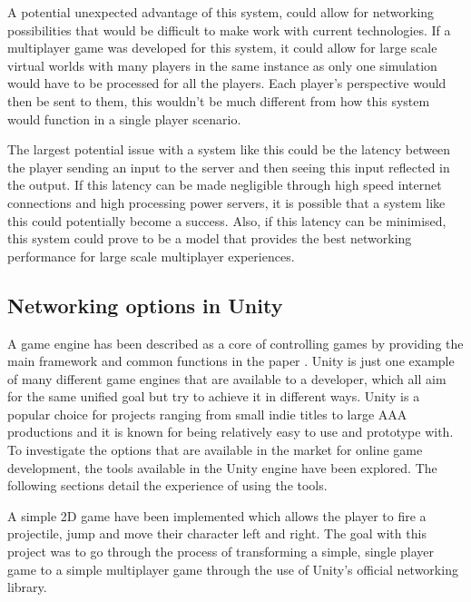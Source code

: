 A potential unexpected advantage of this system, could allow for networking possibilities that would be difficult to make work with current technologies. If a multiplayer game was developed for this system, it could allow for large scale virtual worlds with many players in the same instance as only one simulation would have to be processed for all the players. Each player's perspective would then be sent to them, this wouldn't be much different from how this system would function in a single player scenario.

The largest potential issue with a system like this could be the latency between the player sending an input to the server and then seeing this input reflected in the output. If this latency can be made negligible through high speed internet connections and high processing power servers, it is possible that a system like this could potentially become a success. Also, if this latency can be minimised, this system could prove to be a model that provides the best networking performance for large scale multiplayer experiences.


\subsection{Networking options in Unity}
A game engine has been described as a core of controlling games by providing the main framework and common functions in the paper . Unity is just one example of many different game engines that are available to a developer, which all aim for the same unified goal but try to achieve it in different ways. Unity is a popular choice for projects ranging from small indie titles to large AAA productions and it is known for being relatively easy to use and prototype with. To investigate the options that are available in the market for online game development, the tools available in the Unity engine have been explored. The following sections detail the experience of using the tools.

A simple 2D game have been implemented which allows the player to fire a projectile, jump and move their character left and right. The goal with this project was to go through the process of transforming a simple, single player game to a simple multiplayer game through the use of Unity's official networking library.

